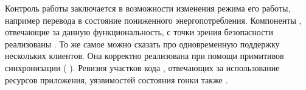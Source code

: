 %
Контроль работы  заключается в возможности изменения режима его работы, например перевода в состояние пониженного энергопотребления. 
%
Компоненты , отвечающие за данную функциональность, с точки зрения безопасности реализованы . 
%
То же самое можно сказать про одновременную поддержку нескольких клиентов. 
%
Она корректно реализована при помощи примитивов синхронизации ( ). 
%
Ревизия участков кода , отвечающих за использование ресурсов приложения, уязвимостей состояния гонки также . 
